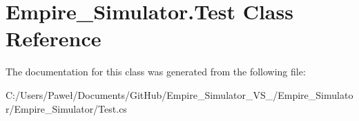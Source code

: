 \hypertarget{class_empire___simulator_1_1_test}{\section{Empire\+\_\+\+Simulator.\+Test Class Reference}
\label{class_empire___simulator_1_1_test}
}


The documentation for this class was generated from the following file\+:\begin{DoxyCompactItemize}
\item 
C\+:/\+Users/\+Paweł/\+Documents/\+Git\+Hub/\+Empire\+\_\+\+Simulator\+\_\+\+V\+S\+\_/\+Empire\+\_\+\+Simulator/\+Empire\+\_\+\+Simulator/Test.\+cs\end{DoxyCompactItemize}
